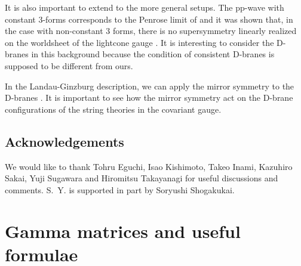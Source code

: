 \documentclass[a4paper,12pt]{article}
\numberwithin{equation}{section}
\begin{document}
It is also important to extend to the more general setups.
The pp-wave with constant 3-forms corresponds to the Penrose limit
of \coordHE{} 
\cite{Hikida:2002in,Lunin:2002fw,Gomis:2002qi,Hikida:2002xu,Gava:2002xb}
and it was shown that, in the case with
non-constant 3 forms, there is no supersymmetry
linearly realized on the worldsheet of the lightcone
gauge \cite{Russo:2002qj}. 
It is interesting to consider the D-branes in this background because
the condition of consistent D-branes is supposed to be different from ours.

In the Landau-Ginzburg description, we can apply the mirror symmetry to
the D-branes \cite{Hori:2000kt,Hori:2000ck}. 
It is important to see how the mirror
symmetry act on the D-brane configurations of 
the string theories in the covariant gauge.




\subsection*{Acknowledgements}
We would like to thank Tohru Eguchi, Isao Kishimoto, Takeo Inami,
Kazuhiro Sakai, Yuji Sugawara
and Hiromitsu Takayanagi for useful discussions and comments.
S.~Y. is supported in part by Soryushi Shogakukai.


\appendix
\section{Gamma matrices and useful formulae}
\end{document}
